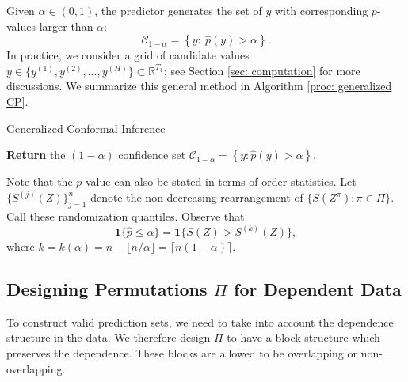 \documentclass[final,12pt]{colt2018} %
\begin{document}
Given $\alpha\in (0,1)$, the predictor generates the set of $y$ with corresponding $p$-values larger than $\alpha$: 
\begin{equation}\label{eq: def S}
\mathcal{C}_{1-\alpha}=\left\{y:\  \hat p (y) > \alpha \right\}.
\end{equation}
In practice, we consider a grid of candidate values $y\in\{y^{(1)},y^{(2)},\dots,y^{(H)} \}\subset \mathbb{R}^{T_1} $; see Section \ref{sec: computation} for more discussions. We summarize this general method in Algorithm \ref{proc: generalized CP}. 

\begin{algorithm}
  \caption{Generalized Conformal Inference}\label{proc: generalized CP}
      {
        \textbf{Return} the $(1-\alpha)$  confidence set  $\mathcal{C}_{1-\alpha}=\left\{y: \hat p (y) > \alpha \right\}.$
      }
\end{algorithm}


Note that the $p$-value can also be stated in terms of order statistics. Let  $\{S^{(j)}(Z)\}_{j=1}^{n}$ denote the non-decreasing rearrangement of $\{S(Z^\pi): \pi \in \Pi\}$. Call these randomization quantiles. Observe that $$
\mathbf{1} \{\hat p  \leq \alpha\} = \mathbf{1}\{ S(Z) > S^{(k)}( Z) \},
$$
where $k = k(\alpha) =  n - \lfloor n/\alpha\rfloor = \lceil n(1-\alpha)\rceil$. %






\subsection{Designing Permutations $\Pi$ for Dependent Data}\label{sec: block permutation}


To construct valid prediction sets, we need to take into account the dependence structure in the data. We therefore design $\Pi$ to have a block structure which preserves the dependence. These blocks are allowed to be overlapping or non-overlapping. 
\end{document}
